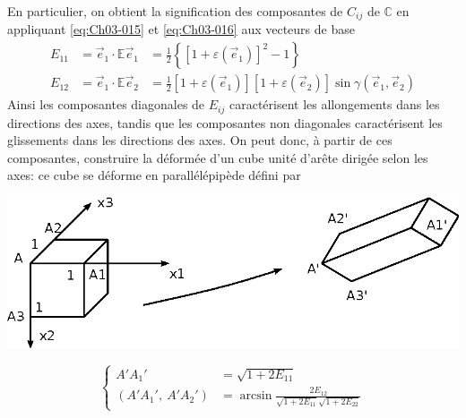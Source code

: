 En particulier, on obtient la signification des composantes de $C_{ij}$ de $\mathbb{C}$ en appliquant \eqref{eq:Ch03-015} et \eqref{eq:Ch03-016} aux vecteurs de base
\begin{eqnarray}
    E_{11} &= \vec{e}_1 \cdot \mathbb{E} \vec{e}_1 &= \frac{1}{2} \left\{ \left[ 1 + \varepsilon \left( \vec{e}_1 \right) \right]^{2} -1 \right\} \label{eq:Ch03-017}\\
    E_{12} &= \vec{e}_1 \cdot \mathbb{E} \vec{e}_2 &= \frac{1}{2} \left[ 1 + \varepsilon \left( \vec{e}_1 \right) \right]\left[ 1 + \varepsilon \left( \vec{e}_2 \right) \right] \sin \gamma \left( \vec{e}_1, \vec{e}_2 \right)  \label{eq:Ch03-018}
\end{eqnarray}
Ainsi les composantes diagonales de $E_{ij}$ caractérisent les allongements dans les directions des axes, tandis que les composantes non diagonales caractérisent les glissements dans les directions des axes.
On peut donc, à partir de ces composantes, construire la déformée d'un cube unité d'arête dirigée selon les axes: ce cube se déforme en parallélépipède défini par
\begin{center}
    \includegraphics{../images/T1_Ch03-0003}
\end{center}
\begin{equation}
    \left\{
    \begin{aligned}
        A'A_1' &= \sqrt{1+2E_{11}}\\
        \left( A'A_1',\ A'A_2' \right) &= \arcsin \frac{2E_{12}}{\sqrt{1+2E_{11}}\sqrt{1+2E_{22}}}
    \end{aligned}
    \right.
    \label{eq:Ch03-019}
\end{equation}

